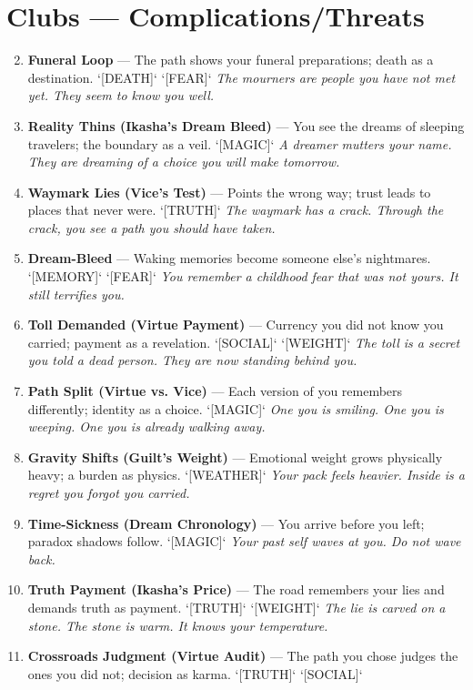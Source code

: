 \section*{Clubs --- Complications/Threats}
\label{sec:ways-between-complications}
\begin{enumerate}
\setcounter{enumi}{1}
\item \textbf{Funeral Loop} --- The path shows your funeral preparations; death as a destination. `[DEATH]` `[FEAR]`
  \hfill \textit{The mourners are people you have not met yet. They seem to know you well.}
\item \textbf{Reality Thins (Ikasha's Dream Bleed)} --- You see the dreams of sleeping travelers; the boundary as a veil. `[MAGIC]`
  \hfill \textit{A dreamer mutters your name. They are dreaming of a choice you will make tomorrow.}
\item \textbf{Waymark Lies (Vice's Test)} --- Points the wrong way; trust leads to places that never were. `[TRUTH]`
  \hfill \textit{The waymark has a crack. Through the crack, you see a path you should have taken.}
\item \textbf{Dream-Bleed} --- Waking memories become someone else's nightmares. `[MEMORY]` `[FEAR]`
  \hfill \textit{You remember a childhood fear that was not yours. It still terrifies you.}
\item \textbf{Toll Demanded (Virtue Payment)} --- Currency you did not know you carried; payment as a revelation. `[SOCIAL]` `[WEIGHT]`
  \hfill \textit{The toll is a secret you told a dead person. They are now standing behind you.}
\item \textbf{Path Split (Virtue vs. Vice)} --- Each version of you remembers differently; identity as a choice. `[MAGIC]`
  \hfill \textit{One you is smiling. One you is weeping. One you is already walking away.}
\item \textbf{Gravity Shifts (Guilt's Weight)} --- Emotional weight grows physically heavy; a burden as physics. `[WEATHER]`
  \hfill \textit{Your pack feels heavier. Inside is a regret you forgot you carried.}
\item \textbf{Time-Sickness (Dream Chronology)} --- You arrive before you left; paradox shadows follow. `[MAGIC]`
  \hfill \textit{Your past self waves at you. Do not wave back.}
\item \textbf{Truth Payment (Ikasha's Price)} --- The road remembers your lies and demands truth as payment. `[TRUTH]` `[WEIGHT]`
  \hfill \textit{The lie is carved on a stone. The stone is warm. It knows your temperature.}
\item[J] \textbf{Crossroads Judgment (Virtue Audit)} --- The path you chose judges the ones you did not; decision as karma. `[TRUTH]` `[SOCIAL]`

\end{enumerate}

